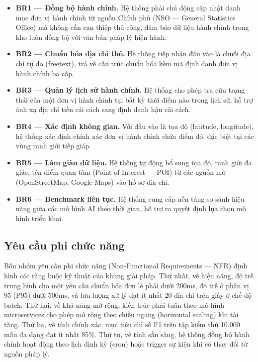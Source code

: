 \begin{itemize}[leftmargin=*]
\item \textbf{BR1 --- Đồng bộ hành chính.} Hệ thống phải chủ động cập nhật danh mục đơn vị hành chính từ nguồn Chính phủ (NSO --- General Statistics Office) mà không cần can thiệp thủ công, đảm bảo dữ liệu hành chính trong kho luôn đồng bộ với văn bản pháp lý hiện hành.
\item \textbf{BR2 --- Chuẩn hóa địa chỉ thô.} Hệ thống tiếp nhận đầu vào là chuỗi địa chỉ tự do (freetext), trả về cấu trúc chuẩn hóa kèm mã định danh đơn vị hành chính ba cấp.
\item \textbf{BR3 --- Quản lý lịch sử hành chính.} Hệ thống cho phép tra cứu trạng thái của một đơn vị hành chính tại bất kỳ thời điểm nào trong lịch sử, hỗ trợ ánh xạ địa chỉ tiền cải cách sang định danh hậu cải cách.
\item \textbf{BR4 --- Xác định không gian.} Với đầu vào là tọa độ (latitude, longitude), hệ thống xác định chính xác đơn vị hành chính chứa điểm đó, đặc biệt tại các vùng ranh giới tiếp giáp.
\item \textbf{BR5 --- Làm giàu dữ liệu.} Hệ thống tự động bổ sung tọa độ, ranh giới đa giác, tên điểm quan tâm (Point of Interest --- POI) từ các nguồn mở (OpenStreetMap, Google Maps) vào hồ sơ địa chỉ.
\item \textbf{BR6 --- Benchmark liên tục.} Hệ thống cung cấp nền tảng so sánh hiệu năng giữa các mô hình AI theo thời gian, hỗ trợ ra quyết định lựa chọn mô hình triển khai.
\end{itemize}

\subsection{Yêu cầu phi chức năng}
\label{sec:non-functional}

Bốn nhóm yêu cầu phi chức năng (Non-Functional Requirements --- NFR) định hình các ràng buộc kỹ thuật của khung giải pháp. Thứ nhất, về hiệu năng, độ trễ trung bình cho một yêu cầu chuẩn hóa đơn lẻ phải dưới 200ms, độ trễ ở phân vị 95 (P95) dưới 500ms, và lưu lượng xử lý đạt ít nhất 20 địa chỉ trên giây ở chế độ batch. Thứ hai, về khả năng mở rộng, kiến trúc phải tuân theo mô hình microservices cho phép mở rộng theo chiều ngang (horizontal scaling) khi tải tăng. Thứ ba, về tính chính xác, mục tiêu chỉ số F1 trên tập kiểm thử 10.000 mẫu đa dạng đạt ít nhất 85\%. Thứ tư, về tính sẵn sàng, hệ thống đồng bộ hành chính hoạt động theo lịch định kỳ (cron) hoặc trigger sự kiện khi có thay đổi từ nguồn pháp lý.

